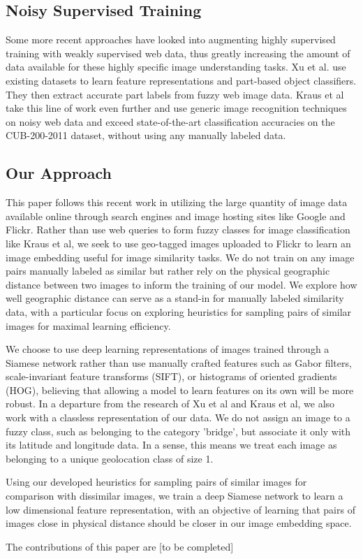 \subsection*{Noisy Supervised Training}

Some more recent approaches have looked into augmenting highly supervised training with weakly supervised web data, thus greatly increasing the amount of data available for these highly specific image understanding tasks. Xu et al.\cite{xu2015augmenting} use existing datasets to learn feature representations and part-based object classifiers. They then extract accurate part labels from fuzzy web image data. Kraus et al take this line of work even further and use generic image recognition techniques on noisy web data and exceed state-of-the-art classification accuracies on the CUB-200-2011 dataset, without using any manually labeled data.\cite{krause2016unreasonable}

\subsection*{Our Approach}
This paper follows this recent work in utilizing the large quantity of image data available online through search engines and image hosting sites like Google and Flickr. Rather than use web queries to form fuzzy classes for image classification like Kraus et al, we seek to use geo-tagged images uploaded to Flickr to learn an image embedding useful for image similarity tasks. We do not train on any image pairs manually labeled as similar but rather rely on the physical geographic distance between two images to inform the training of our model. We explore how well geographic distance can serve as a stand-in for manually labeled similarity data, with a particular focus on exploring heuristics for sampling pairs of similar images for maximal learning efficiency.

We choose to use deep learning representations of images trained through a Siamese network rather than use manually crafted features such as Gabor filters, scale-invariant feature transforms (SIFT), or histograms of oriented gradients (HOG), believing that allowing a model to learn features on its own will be more robust. In a departure from the research of Xu et al and Kraus et al, we also work with a classless representation of our data. We do not assign an image to a fuzzy class, such as belonging to the category 'bridge', but associate it only with its latitude and longitude data. In a sense, this means we treat each image as belonging to a unique geolocation class of size 1.

Using our developed heuristics for sampling pairs of similar images for comparison with dissimilar images, we train a deep Siamese network to learn a low dimensional feature representation, with an objective of learning that pairs of images close in physical distance should be closer in our image embedding space.

The contributions of this paper are [to be completed]
